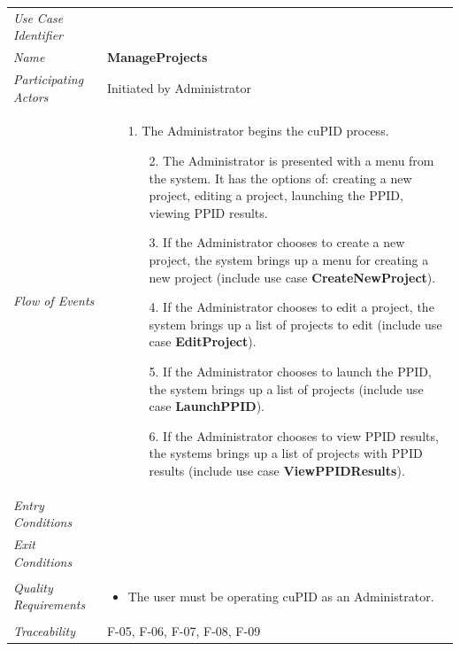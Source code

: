 \documentclass[12pt,letterpaper]{article}
\begin{document}
\begin{center}
    \begin{tabu} to 
        \toprule
		Use Case Identifier & \manageprojects{} \\
		Name & {\bf ManageProjects} \\
        Participating Actors & Initiated by Administrator \\
		Flow of Events & 
	    \begin{enumerate}[topsep=-1em,leftmargin=*]
		    \item[1.] The Administrator begins the cuPID process.
			\begin{enumerate}
				\item[2.] The Administrator is presented with a menu from the system. It has the options of: creating a new project, editing a project, launching the PPID, viewing PPID results.
				\item[3.] If the Administrator chooses to create a new project, the system brings up a menu for creating a new project (include use case \textbf{CreateNewProject}).
				\item[4.] If the Administrator chooses to edit a project, the system brings up a list of projects to edit (include use case \textbf{EditProject}).
				\item[5.] If the Administrator chooses to launch the PPID, the system brings up a list of projects (include use case \textbf{LaunchPPID}).
				\item[6.] If the Administrator chooses to view PPID results, the systems brings up a list of projects with PPID results (include use case \textbf{ViewPPIDResults}).
			\end{enumerate}
		\end{enumerate} \\

		Entry Conditions & \\

		Exit Conditions & \\

		Quality Requirements &
		\begin{itemize}[topsep=-1em,leftmargin=*]
		    \item The user must be operating cuPID as an Administrator. 
        \end{itemize} \\

		Traceability & F-05, F-06, F-07, F-08, F-09\\
        \toprule
    \end{tabu}
\end{center}
\end{document}
